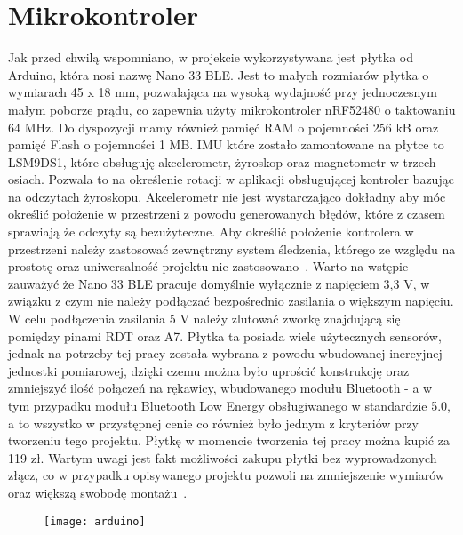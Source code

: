 	\section{Mikrokontroler}
	\label{sec:arduino}
	Jak przed chwilą wspomniano, w projekcie wykorzystywana jest płytka od Arduino, która nosi nazwę Nano 33 BLE. Jest to małych rozmiarów płytka o  wymiarach 45 x 18 mm, pozwalająca na wysoką wydajność przy jednoczesnym małym poborze prądu, co zapewnia użyty mikrokontroler nRF52480 o taktowaniu 64 MHz. Do dyspozycji mamy również pamięć RAM o pojemności 256 kB oraz pamięć Flash o pojemności 1 MB. IMU które zostało zamontowane na płytce to LSM9DS1, które obsługuję akcelerometr, żyroskop oraz magnetometr w trzech osiach. Pozwala to na określenie rotacji w aplikacji obsługującej kontroler bazując na odczytach żyroskopu. Akcelerometr nie jest wystarczająco dokładny aby móc określić położenie w przestrzeni z powodu generowanych błędów, które z czasem sprawiają że odczyty są bezużyteczne. Aby określić położenie kontrolera w przestrzeni należy zastosować zewnętrzny system śledzenia, którego ze względu na prostotę oraz uniwersalność projektu nie zastosowano~\cite{displacement}. Warto na wstępie zauważyć że Nano 33 BLE pracuje domyślnie wyłącznie z napięciem 3,3 V, w związku z czym nie należy podłączać bezpośrednio zasilania o większym napięciu. W celu podłączenia zasilania 5 V należy zlutować zworkę znajdującą się pomiędzy pinami RDT oraz A7. Płytka ta posiada wiele użytecznych sensorów, jednak na potrzeby tej pracy została wybrana z powodu wbudowanej inercyjnej jednostki pomiarowej, dzięki czemu można było uprościć konstrukcję oraz zmniejszyć ilość połączeń na rękawicy, wbudowanego modułu Bluetooth - a w tym przypadku modułu Bluetooth Low Energy obsługiwanego w standardzie 5.0, a to wszystko w przystępnej cenie co również było jednym z kryteriów przy tworzeniu tego projektu. Płytkę w momencie tworzenia tej pracy można kupić za 119 zł. Wartym uwagi jest fakt możliwości zakupu płytki bez wyprowadzonych złącz, co w przypadku opisywanego projektu pozwoli na zmniejszenie wymiarów oraz większą swobodę montażu~\cite{botland-arduino}.
\begin{figure}[h]
\centering
\texttt{[image: arduino]}
\label{fig:arduino}
\end{figure}
	
